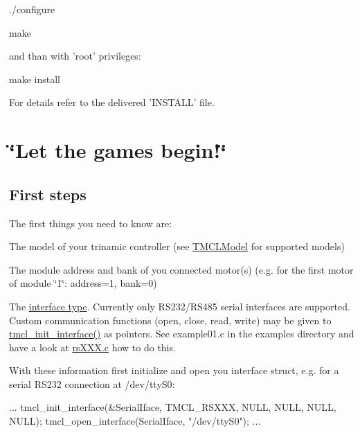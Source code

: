 \begin{DoxyItemize}
\item ./configure
\item make
\end{DoxyItemize}

and than with 'root' privileges:


\begin{DoxyItemize}
\item make install
\end{DoxyItemize}

For details refer to the delivered 'INSTALL' file.\hypertarget{index_step1}{}\section{\char`\"{}Let the games begin!\char`\"{}}\label{index_step1}
\hypertarget{index_firststeps}{}\subsection{First steps}\label{index_firststeps}
The first things you need to know are:


\begin{DoxyItemize}
\item The model of your trinamic controller (see \hyperlink{tmcldefs_8h_a5b6ac18c2401b554e24fe3313eda6e9a}{TMCLModel} for supported models)
\item The module address and bank of you connected motor(s) (e.g. for the first motor of module \char`\"{}1\char`\"{}: address=1, bank=0)
\item The \hyperlink{tmcldefs_8h_a3c0af0cc3f62b9e4a1daea7839da918e}{interface type}. Currently only RS232/RS485 serial interfaces are supported. Custom communication functions (open, close, read, write) may be given to \hyperlink{interface_8h_a6234d4f85bda5c0132fdecde69565ef4}{tmcl\_\-init\_\-interface()} as pointers. See example01.c in the examples directory and have a look at \hyperlink{rsXXX_8c_source}{rsXXX.c} how to do this.
\end{DoxyItemize}

With these information first initialize and open you interface struct, e.g. for a serial RS232 connection at /dev/ttyS0:


\begin{DoxyCode}
 ...
 tmcl_init_interface(&SerialIface, TMCL_RSXXX, NULL, NULL, NULL, NULL);
 tmcl_open_interface(SerialIface, "/dev/ttyS0");
 ...
\end{DoxyCode}


